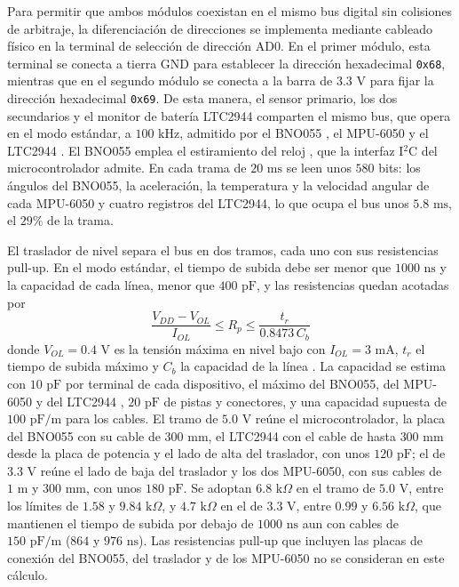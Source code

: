 \documentclass[../../General.tex]{subfiles}
\begin{document}
Para permitir que ambos módulos coexistan en el mismo bus digital sin colisiones de arbitraje, la diferenciación de direcciones se implementa mediante cableado físico en la terminal de selección de dirección AD0. En el primer módulo, esta terminal se conecta a tierra GND para establecer la dirección hexadecimal \texttt{0x68}, mientras que en el segundo módulo se conecta a la barra de $3.3\text{ V}$ para fijar la dirección hexadecimal \texttt{0x69}. De esta manera, el sensor primario, los dos secundarios y el monitor de batería LTC2944 comparten el mismo bus, que opera en el modo estándar, a $100\text{ kHz}$, admitido por el BNO055 \citep{bosch_bno055}, el MPU-6050 \citep{invensense_mpu6050} y el LTC2944 \citep{adi_ltc2944}. El BNO055 emplea el estiramiento del reloj \citep{bosch_bno055}, que la interfaz I$^2$C del microcontrolador admite. En cada trama de $20\text{ ms}$ se leen unos $580$ bits: los ángulos del BNO055, la aceleración, la temperatura y la velocidad angular de cada MPU-6050 y cuatro registros del LTC2944, lo que ocupa el bus unos $5.8\text{ ms}$, el $29\%$ de la trama.

El traslador de nivel separa el bus en dos tramos, cada uno con sus resistencias pull-up. En el modo estándar, el tiempo de subida debe ser menor que $1000\text{ ns}$ y la capacidad de cada línea, menor que $400\text{ pF}$, y las resistencias quedan acotadas por \citep{nxp_um10204}
\begin{equation}
\frac{V_{DD} - V_{OL}}{I_{OL}} \leq R_p \leq \frac{t_r}{0.8473\, C_b}
\end{equation}
donde $V_{OL} = 0.4\text{ V}$ es la tensión máxima en nivel bajo con $I_{OL} = 3\text{ mA}$, $t_r$ el tiempo de subida máximo y $C_b$ la capacidad de la línea \citep{nxp_um10204}. La capacidad se estima con $10\text{ pF}$ por terminal de cada dispositivo, el máximo del BNO055, del MPU-6050 y del LTC2944 \citep{bosch_bno055,invensense_mpu6050,adi_ltc2944}, $20\text{ pF}$ de pistas y conectores, y una capacidad supuesta de $100\text{ pF/m}$ para los cables. El tramo de $5.0\text{ V}$ reúne el microcontrolador, la placa del BNO055 con su cable de $300\text{ mm}$, el LTC2944 con el cable de hasta $300\text{ mm}$ desde la placa de potencia y el lado de alta del traslador, con unos $120\text{ pF}$; el de $3.3\text{ V}$ reúne el lado de baja del traslador y los dos MPU-6050, con sus cables de $1\text{ m}$ y $300\text{ mm}$, con unos $180\text{ pF}$. Se adoptan $6.8\text{ k}\Omega$ en el tramo de $5.0\text{ V}$, entre los límites de $1.58$ y $9.84\text{ k}\Omega$, y $4.7\text{ k}\Omega$ en el de $3.3\text{ V}$, entre $0.99$ y $6.56\text{ k}\Omega$, que mantienen el tiempo de subida por debajo de $1000\text{ ns}$ aun con cables de $150\text{ pF/m}$ ($864$ y $976\text{ ns}$). Las resistencias pull-up que incluyen las placas de conexión del BNO055, del traslador y de los MPU-6050 no se consideran en este cálculo.
\end{document}
